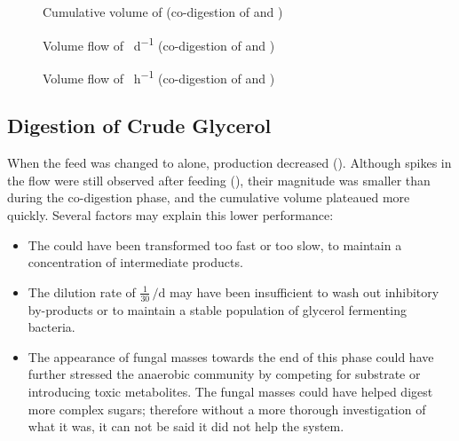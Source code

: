 \documentclass[12pt, a4paper, oneside]{report}
\begin{document}
\begin{figure}[H]
    \centering
    \caption{Cumulative volume of  \unit{\nml} (co-digestion of  and )}
    \label{graph:ra-accumulation}
\end{figure}

\begin{figure}[H]
    \centering
    \caption{Volume flow of  \unit{\nml\per\day} (co-digestion of  and )}
    \label{graph:ra-flow}
\end{figure}

\begin{figure}[H]
    \centering
    \caption{Volume flow of  \unit{\nml\per\hour} (co-digestion of  and )}
    \label{graph:ra-flow-30}
\end{figure}

\subsection{Digestion of Crude Glycerol}
\label{subsec:glycerol_phase}

When the feed was changed to  alone,  production decreased (). Although spikes in the flow were still observed after feeding (), their magnitude was smaller than during the co-digestion phase, and the cumulative  volume plateaued more quickly. Several factors may explain this lower performance:
\begin{itemize}
    \item The  could have been transformed too fast or too slow, to maintain a concentration of intermediate products.
    \item The dilution rate of $\frac{1}{30}\,\unit{\per\day}$ may have been insufficient to wash out inhibitory by-products or to maintain a stable population of glycerol fermenting bacteria.
    \item The appearance of fungal masses towards the end of this phase could have further stressed the anaerobic community by competing for substrate or introducing toxic metabolites. The fungal masses could have helped digest more complex sugars; therefore without a more thorough investigation of what it was, it can not be said it did not help the  system.
\end{itemize}
\end{document}
